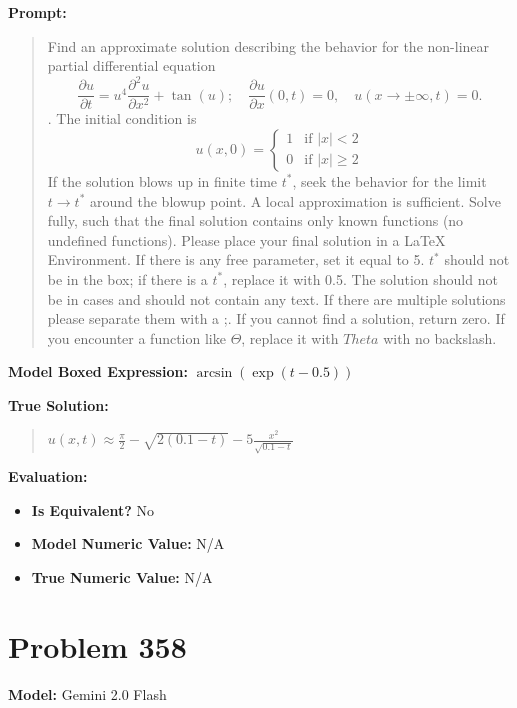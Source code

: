 \documentclass{article}
\begin{document}
{\textbf{Prompt:}
\begin{quote}
Find an approximate solution describing the behavior for the non-linear partial differential equation $$ \frac{\partial u}{\partial t} = u^4 \frac{\partial^2 u}{\partial x^2} + \tan(u);\quad \frac{\partial u}{\partial x}(0, t) = 0,\quad u(x\to\pm\infty, t) = 0.$$. The initial condition is $$ u(x, 0) = \begin{cases} 1 & \text{if } |x| < 2 \\ 0 & \text{if } |x| \ge 2 \end{cases} $$ If the solution blows up in finite time $t^*$, seek the behavior for the limit $t \rightarrow t^*$ around the blowup point. A local approximation is sufficient. Solve fully, such that the final solution contains only known functions (no undefined functions). Please place your final solution in a \boxed{} LaTeX Environment. If there is any free parameter, set it equal to 5. $t^*$ should not be in the box; if there is a $t^*$, replace it with 0.5. The solution should not be in cases and should not contain any text. If there are multiple solutions please separate them with a ;. If you cannot find a solution, return zero. If you encounter a function like $\Theta$, replace it with $Theta$ with no backslash.
\end{quote}
\textbf{Model Boxed Expression:} $\arcsin(\exp(t-0.5))$

\textbf{True Solution:}
\begin{quote}
$u(x,t) \approx \frac{\pi}{2} - \sqrt{2(0.1-t)} - 5 \frac{x^2}{\sqrt{0.1-t}}$
\end{quote}

\textbf{Evaluation:}
\begin{itemize}
\item \textbf{Is Equivalent?} No
\item \textbf{Model Numeric Value:} N/A
\item \textbf{True Numeric Value:} N/A
\end{itemize}
\vspace{1cm}
\section*{Problem 358}
\textbf{Model:} Gemini 2.0 Flash

}
\end{document}
